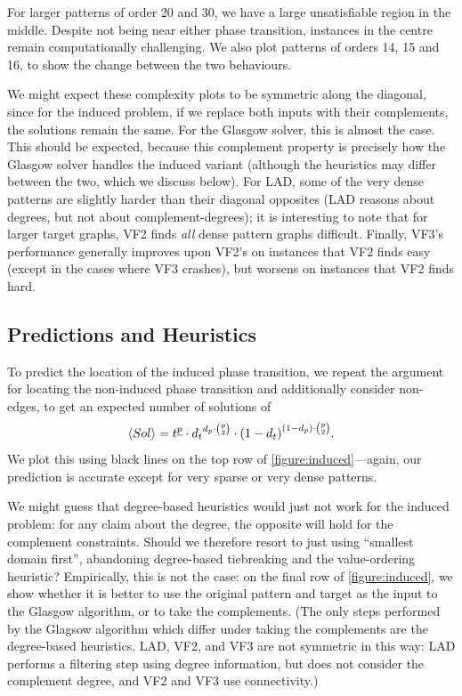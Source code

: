 \documentclass[twoside,11pt]{article}
\begin{document}
For larger patterns of order 20 and 30, we have a large unsatisfiable region in the middle. Despite
not being near either phase transition, instances in the centre remain computationally challenging.
We also plot patterns of orders 14, 15 and 16, to show the change between the two behaviours.

We might expect these complexity plots to be symmetric along the diagonal, since for the induced
problem, if we replace both inputs with their complements, the solutions remain the same.  For the
Glasgow solver, this is almost the case. This should be expected, because this complement property is
precisely how the Glasgow solver handles the induced variant (although the heuristics may differ
between the two, which we discuss below). For LAD, some of the very dense patterns are slightly
harder than their diagonal opposites (LAD reasons about degrees, but not about complement-degrees);
it is interesting to note that for larger target graphs, VF2 finds \emph{all} dense pattern graphs
difficult. Finally, VF3's performance generally improves upon VF2's on instances that VF2 finds easy
(except in the cases where VF3 crashes), but worsens on instances that VF2 finds hard.

\subsection{Predictions and Heuristics}

To predict the location of the induced phase transition, we repeat the argument for locating the
non-induced phase transition and additionally consider non-edges, to get an expected number of
solutions of \begin{equation}\label{equation:induced-prediction} \langle Sol \rangle = t^{\underline{p}} \cdot {d_t}^{d_p \cdot \binom{p}{2}} \cdot
{(1 - d_{t})}^{(1 - d_{p}) \cdot \binom{p}{2}} \textnormal{.} \end{equation} We plot this using black lines on
the top row of \cref{figure:induced}---again, our prediction is accurate except for very sparse or
very dense patterns.

We might guess that degree-based heuristics would just not work for the induced problem: for any
claim about the degree, the opposite will hold for the complement constraints. Should we therefore
resort to just using ``smallest domain first'', abandoning degree-based tiebreaking and the
value-ordering heuristic? Empirically, this is not the case: on the final row of
\cref{figure:induced}, we show whether it is better to use the original pattern and target as the
input to the Glasgow algorithm, or to take the complements.  (The only steps performed by the
Glagsow algorithm which differ under taking the complements are the degree-based heuristics.  LAD,
VF2, and VF3 are not symmetric in this way: LAD performs a filtering step using degree information,
but does not consider the complement degree, and VF2 and VF3 use connectivity.)
\end{document}
